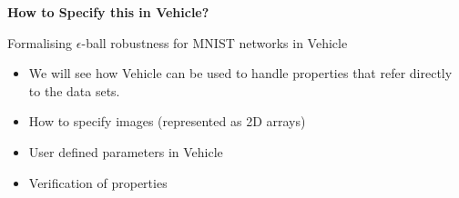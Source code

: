 \documentclass[t,compress,aspectratio=169]{beamer}
\begin{document}
\begin{frame}
\vspace {8em}

    \begin{center}
        \Huge{\textcolor{aisecred}{\textbf{How to Specify this in Vehicle?}}}
    \end{center}
\end{frame}




\begin{frame}[fragile]{Formalising $\epsilon$-ball robustness for MNIST networks in Vehicle}

\begin{itemize}
    \item We will see how Vehicle can be used to handle properties that refer directly to the data sets.
    \item  How to specify images (represented as 2D arrays)
    \item User defined parameters in Vehicle
    \item Verification of properties
\end{itemize}
\end{frame}
\end{document}
